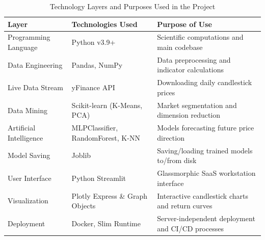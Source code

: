 \documentclass[12pt,a4paper]{report}
\begin{document}
\begin{table}[H]
    \centering
    \caption{Technology Layers and Purposes Used in the Project}
    \begin{tabularx}{\textwidth}{lp{5cm}X}
        \toprule
        \textbf{Layer} & \textbf{Technologies Used} & \textbf{Purpose of Use} \\
        \midrule
        Programming Language & Python v3.9+ & Scientific computations and main codebase \\
        Data Engineering & Pandas, NumPy & Data preprocessing and indicator calculations \\
        Live Data Stream & yFinance API & Downloading daily candlestick prices \\
        Data Mining & Scikit-learn (K-Means, PCA) & Market segmentation and dimension reduction \\
        Artificial Intelligence & MLPClassifier, RandomForest, K-NN & Models forecasting future price direction \\
        Model Saving & Joblib & Saving/loading trained models to/from disk \\
        User Interface & Python Streamlit & Glassmorphic SaaS workstation interface \\
        Visualization & Plotly Express \& Graph Objects & Interactive candlestick charts and return curves \\
        Deployment & Docker, Slim Runtime & Server-independent deployment and CI/CD processes \\
        \bottomrule
    \end{tabularx}
    \label{tab:tech_stack}
\end{table}
\end{document}
